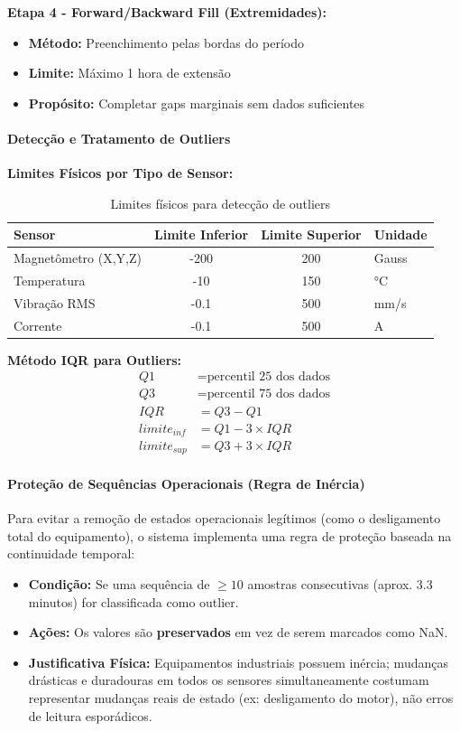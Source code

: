 \textbf{Etapa 4 - Forward/Backward Fill (Extremidades):}
\begin{itemize}
    \item \textbf{Método:} Preenchimento pelas bordas do período
    \item \textbf{Limite:} Máximo 1 hora de extensão
    \item \textbf{Propósito:} Completar gaps marginais sem dados suficientes
\end{itemize}

\paragraph{Detecção e Tratamento de Outliers}

\textbf{Limites Físicos por Tipo de Sensor:}
\begin{table}[H]
\centering
\caption{Limites físicos para detecção de outliers}
\begin{tabular}{|l|c|c|l|}
\hline
\textbf{Sensor} & \textbf{Limite Inferior} & \textbf{Limite Superior} & \textbf{Unidade} \\
\hline
Magnetômetro (X,Y,Z) & -200 & 200 & Gauss \\
Temperatura & -10 & 150 & °C \\
Vibração RMS & -0.1 & 500 & mm/s \\
Corrente & -0.1 & 500 & A \\
\hline
\end{tabular}
\end{table}

\textbf{Método IQR para Outliers:}
\begin{align}
Q1 &= \text{percentil 25 dos dados} \\
Q3 &= \text{percentil 75 dos dados} \\
IQR &= Q3 - Q1 \\
limite_{inf} &= Q1 - 3 \times IQR \\
limite_{sup} &= Q3 + 3 \times IQR
\end{align}

\paragraph{Proteção de Sequências Operacionais (Regra de Inércia)}

Para evitar a remoção de estados operacionais legítimos (como o desligamento total do equipamento), o sistema implementa uma regra de proteção baseada na continuidade temporal:
\begin{itemize}
    \item \textbf{Condição:} Se uma sequência de $\geq 10$ amostras consecutivas (aprox. 3.3 minutos) for classificada como outlier.
    \item \textbf{Ações:} Os valores são \textbf{preservados} em vez de serem marcados como NaN.
    \item \textbf{Justificativa Física:} Equipamentos industriais possuem inércia; mudanças drásticas e duradouras em todos os sensores simultaneamente costumam representar mudanças reais de estado (ex: desligamento do motor), não erros de leitura esporádicos.
\end{itemize}

